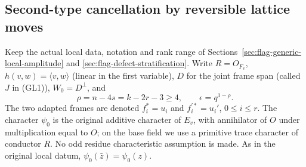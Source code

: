 \subsection{Second-type cancellation by reversible lattice moves}
\label{sec:flag-second-type-cancellation}

Keep the actual local data, notation and rank range of
Sections~\ref{sec:flag-generic-local-amplitude} and
\ref{sec:flag-defect-stratification}. Write \(R=O_{F_v}\),
\(h(v,w)=\langle v,w\rangle\) (linear in the first variable),
\(D\) for the joint frame span (called \(J\) in (GL1)),
\(W_0=D^\perp\), and
\[
 \rho=n-4s=k-2r-3\ge4,\qquad \epsilon=q^{1-\rho}.
\]
The two adapted frames are denoted \(f_i^*=u_i\) and
\(f_i^{\prime *}=u_i'\), \(0\le i\le r\).
The character \(\psi_0\) is the original additive character
of \(E_v\), with annihilator of \(O\) under multiplication
equal to \(O\); on the base field we use a primitive trace
character of conductor \(R\). No odd residue characteristic
assumption is made.
As in the original local datum, \(\psi_0(\bar z)=\psi_0(z)\).

